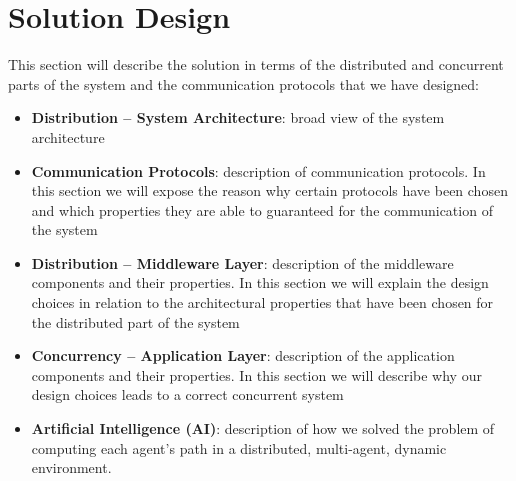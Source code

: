 \section{Solution Design}

This section will describe the solution in terms of the distributed and
concurrent parts of the system and the communication protocols that we have
designed:

\begin{itemize}
\item \textbf{Distribution -- System Architecture}:
  broad view of the system architecture
\item \textbf{Communication Protocols}:
  description of communication protocols. In this section we will expose the
  reason why certain protocols have been chosen and which properties they are
  able to guaranteed for the communication of the system
\item \textbf{Distribution -- Middleware Layer}:
  description of the middleware components and their properties. In this
  section we will explain the design choices in relation to the architectural
  properties that have been chosen for the distributed part of the system
\item \textbf{Concurrency -- Application Layer}:
  description of the application components and their properties. In this
  section we will describe why our design choices leads to a correct concurrent
  system
\item \textbf{Artificial Intelligence (AI)}:
  description of how we solved the problem of computing each agent's path
  in a distributed, multi-agent, dynamic environment.
\end{itemize}













